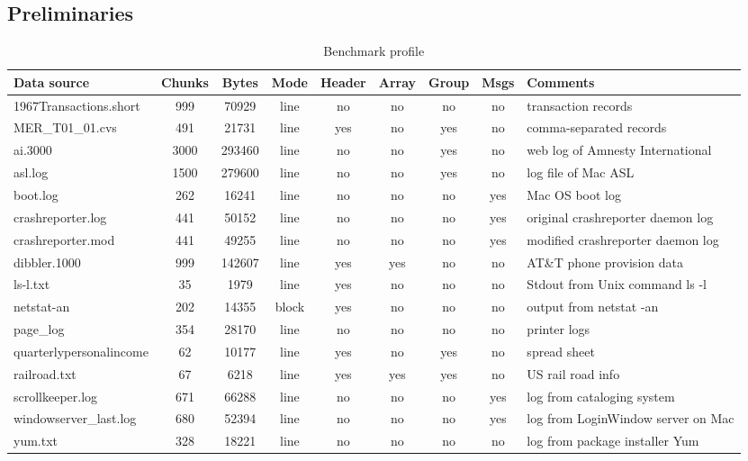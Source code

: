 \subsection{Preliminaries}
\begin{table*}
\begin{center}
\begin{tabular}{|l|c|c|c|c|c|c|c|l|} \hline
Data source	& Chunks & Bytes	& Mode  &Header	& Array	& Group & Msgs 	& Comments \\ \hline \hline
1967Transactions.short	& 999	& 70929	& line	& no	& no	& no	& no	& transaction records \\ \hline
MER\_T01\_01.cvs	& 491	& 21731 & line  & yes	& no	& yes	& no	& comma-separated records\\ \hline
ai.3000		& 3000		& 293460 & line	& no	& no	& yes	& no	& web log of Amnesty International \\ \hline
asl.log &	1500	& 279600	& line	& no	& no	& yes	& no	& log file of Mac ASL \\ \hline	
boot.log	& 262	& 16241		& line	& no	& no	& no	& yes	& Mac OS boot log \\ \hline
crashreporter.log & 441	& 50152 	& line	& no	& no	& no	& yes	& original crashreporter daemon log \\ \hline
crashreporter.mod & 441	& 49255		& line	& no	& no	& no	& yes	& modified crashreporter daemon log \\ \hline
dibbler.1000	& 999	& 142607 	& line	& yes	& yes	& no	& no	& AT\&T phone provision data \\ \hline
ls-l.txt	& 35	& 1979		& line	& yes	& no	& no	& no	& Stdout from Unix command ls -l \\ \hline
netstat-an	& 202	& 14355		& block	& yes	& no	& no	& no	& output from netstat -an \\ \hline
page\_log	& 354	& 28170		& line	& no	& no	& no	& no	& printer logs \\ \hline
quarterlypersonalincome & 62	& 10177	& line	& yes	& no	& yes	& no	& spread sheet \\ \hline
railroad.txt	& 67	& 6218		& line	& yes	& yes	& yes	& no	& US rail road info \\ \hline
scrollkeeper.log & 671	& 66288		& line	& no	& no	& no	& yes	& log from cataloging system \\ \hline
windowserver\_last.log & 680	& 52394	& line	& no	& no	& no	& yes	& log from LoginWindow server on Mac \\ \hline
yum.txt		& 328	& 18221		& line	& no	& no	& no	& no	& log from package installer Yum \\ \hline
\end{tabular}
\caption{Benchmark profile} \label{tab:benchmarks}
\end{center}
\end{table*}

